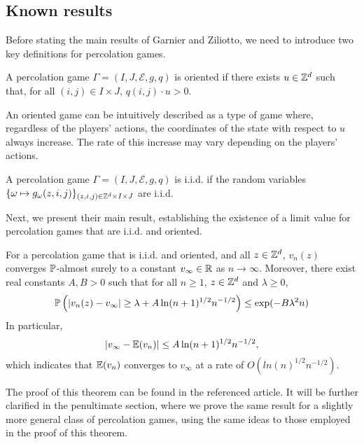 	\subsection{Known results}
	Before stating the main results of Garnier and Ziliotto, we need to introduce two key definitions for percolation games.

	\begin{definition}
		A percolation game $\Gamma = (I, J, \mathcal{E}, g, q)$ is oriented if there exists $u \in \mathbb{Z}^d$ such that, for all $(i, j) \in I \times J$, $q(i, j) \cdot u > 0$.
	\end{definition}

	An oriented game can be intuitively described as a type of game where, regardless of the players' actions, the coordinates of the state with respect to $u$ always increase. The rate of this increase may vary depending on the players' actions.

	\begin{definition}
		A percolation game $\Gamma = (I, J, \mathcal{E}, g, q)$ is i.i.d. if the random variables $\{\omega \mapsto g_{\omega}(z, i, j)\}_{(z, i, j) \in \mathbb{Z}^d \times I \times J}$ are i.i.d.
	\end{definition}
	
 	
 	Next, we present their main result, establishing the existence of a limit value for percolation games that are i.i.d. and oriented.

	\begin{theorem}\label{theorem_iid_and_oriented_percolation_games}
		For a percolation game that is i.i.d. and oriented, and all $z \in \mathbb{Z}^d$, $v_n(z)$ converges $\mathbb{P}$-almost surely to a constant $v_{\infty} \in \mathbb{R}$ as $n \to \infty$. Moreover, there exist real constants $A, B > 0$ such that for all $n \geq 1$, $z \in \mathbb{Z}^d$ and $\lambda \geq 0$,
		\[
			\mathbb{P}\left(|v_n(z) - v_{\infty}| \geq \lambda + A\ln(n + 1)^{1/2}n^{-1/2} \right) \leq \exp(-B\lambda^2n)
		\]
		In particular, 
		\[
			|v_{\infty} - \mathbb{E}(v_n)| \leq A\ln(n + 1)^{1/2}n^{-1/2},
		\]
		which indicates that $\mathbb{E}(v_n)$ converges to $v_{\infty}$ at a rate of $O(ln(n)^{1/2}n^{-1/2})$.
	\end{theorem}

	The proof of this theorem can be found in the referenced article. It will be further clarified in the penultimate section, where we prove the same result for a slightly more general class of percolation games, using the same ideas to those employed in the proof of this theorem.


